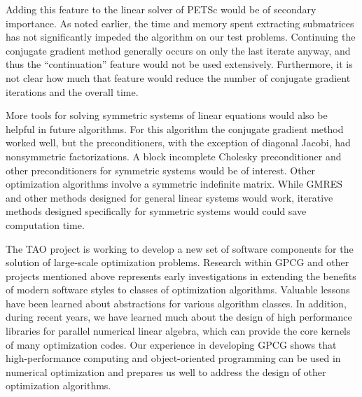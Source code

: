 Adding this feature to the linear solver of PETSc would be of
secondary importance.
As noted earlier, the time and memory spent extracting submatrices
has not significantly impeded the algorithm on our test problems.
Continuing the conjugate gradient method generally occurs on only the
last iterate anyway, and thus the ``continuation'' feature would
not be used extensively.  Furthermore, it is not clear how much
that feature would reduce the number of conjugate
gradient iterations and the overall time.

More tools for solving symmetric systems of linear equations would
also be helpful in future algorithms.  For this algorithm the
conjugate gradient method worked well, but the preconditioners,
with the exception of diagonal Jacobi, had nonsymmetric factorizations.
A block incomplete Cholesky preconditioner and other
preconditioners for symmetric systems would be of interest.  Other
optimization algorithms involve a symmetric indefinite matrix.  While
GMRES and other methods designed for general linear systems would
work, iterative methods designed specifically for symmetric systems
would could save computation time.

The TAO project is working to  develop a
new set of software
components for the solution of large-scale optimization problems.
Research within GPCG and other projects mentioned
above represents early investigations in extending the benefits of modern
software styles to classes of optimization algorithms.
Valuable lessons have been learned about
abstractions for various algorithm classes.
In addition, during recent years, we have learned much about the design
of high  performance libraries for
parallel numerical linear algebra, which can
provide the core kernels of many optimization codes.
Our experience in developing GPCG
shows that high-performance computing
and object-oriented programming can be used in numerical optimization
and prepares us
well to address the design of other optimization algorithms.

\par
